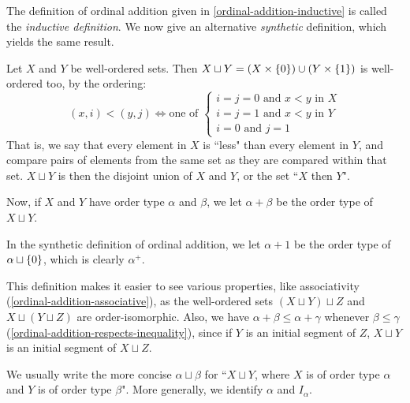 \documentclass{article}
\begin{document}
\begin{note}
	The definition of ordinal addition given in \ref{ordinal-addition-inductive} is called the \textit{inductive definition}. We now give an alternative \textit{synthetic} definition, which yields the same result.
\end{note}

\begin{definition}
	\label{ordinal-addition-synthetic}
    Let $X$ and $Y$ be well-ordered sets. Then $X \sqcup Y = (X \times \left\lbrace 0 \right\rbrace) \cup (Y \times \left\lbrace 1 \right\rbrace)$ is well-ordered too, by the ordering:
    \[
	(x, i) < (y, j) \iff \text{one of } \begin{cases}
		i = j = 0 \text{ and } x < y \text{ in } X \\
		i = j = 1 \text{ and } x < y \text{ in } Y \\
		i = 0 \text{ and } j = 1
	\end{cases}
	\]
	That is, we say that every element in $X$ is ``less" than every element in $Y$, and compare pairs of elements from the same set as they are compared within that set. $X \sqcup Y$ is then the disjoint union of $X$ and $Y$, or the set ``$X$ then $Y$".
	
	Now, if $X$ and $Y$ have order type $\alpha$ and $\beta$, we let $\alpha + \beta$ be the order type of $X \sqcup Y$.
\end{definition}

\begin{note}
	In the synthetic definition of ordinal addition, we let $\alpha + 1$ be the order type of $\alpha \sqcup \left\lbrace 0 \right\rbrace$, which is clearly $\alpha^+$.
\end{note}

\begin{note}
	This definition makes it easier to see various properties, like associativity (\ref{ordinal-addition-associative}), as the well-ordered sets $(X \sqcup Y) \sqcup Z$ and $X \sqcup (Y \sqcup Z)$ are order-isomorphic. Also, we have $\alpha + \beta \leq \alpha + \gamma$ whenever $\beta \leq \gamma$ (\ref{ordinal-addition-respects-inequality}), since if $Y$ is an initial segment of $Z$, $X \sqcup Y$ is an initial segment of $X \sqcup Z$.
\end{note}

\begin{note}
	We usually write the more concise $\alpha \sqcup \beta$ for ``$X \sqcup Y$, where $X$ is of order type $\alpha$ and $Y$ is of order type $\beta$". More generally, we identify $\alpha$ and $I_\alpha$.
\end{note}
\end{document}
